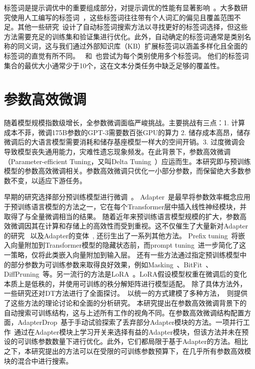 标签词是提示调优中的重要组成部分，对提示调优的性能有显著影响~\cite{holtzman2021surface, gao2020making}。大多数研究使用人工编写的标签词~\cite{schick2020exploiting}，这些标签词往往带有个人词汇的偏见且覆盖范围不足。其他一些研究~\cite{gao2020making, shin2020autoprompt,liu2021gpt,schick2020automatically}设计了自动标签词搜索方法以寻找更好的标签词选择，但这些方法需要充足的训练集和验证集进行优化。此外，自动确定的标签词通常是类别名称的同义词，这与我们通过外部知识库（KB）扩展标签词以涵盖多样化且全面的标签词的直觉有所不同。  
~\citet{schick2020automatically}和~\citet{shin2020autoprompt}也尝试为每个类别使用多个标签词。  
他们的标签词集合的最优大小通常少于10个，这在文本分类任务中缺乏足够的覆盖性。

\section{参数高效微调}
随着模型规模指数级增长，全参数微调面临严峻挑战。主要挑战有三点：1. 计算成本不菲，微调175B参数的GPT-3需要数百张GPU的算力 2. 储存成本高昂，储存微调后的大语言模型需要消耗和储存基座模型一样大的空间开销。3. 过度微调会导致模型丧失通用能力，灾难性遗忘现象频发。在此背景下，参数高效微调（Parameter-efficient Tuning，又叫Delta Tuning~\cite{ding2022delta}）应运而生。本研究即与预训练模型的参数高效微调相关。参数高效微调只优化一小部分参数，而保留绝大多数参数不变，以适应下游任务。

早期的研究选择部分预训练模型进行微调~\cite{tajbakhsh2016convolutional, guo2020adafilter, guo2019spottune}。  
Adapter~\cite{houlsby2019parameter}是最早将参数效率概念应用于预训练语言模型的方法之一，它在每个Transformer层中插入线性神经模块，并取得了与全量微调相当的结果。  
随着近年来预训练语言模型规模的扩大，参数高效微调因其在计算和存储上的高效性而受到重视。这不仅催生了大量新对Adapter的研究~\cite{pfeiffer2020adapterfusion,he2021effectiveness} %
以及Adapter的变体~\cite{pfeiffer2020adapterfusion, mahabadi2021compacter,sung2021vl},  %
还衍生出了一系列其他方法。  
Prefix tuning~\cite{li2021prefix}将嵌入向量附加到Transformer模型的隐藏状态前，而prompt tuning~\cite{lester2021power}进一步简化了这一策略，仅将此类嵌入向量附加到输入层。  
还有一些方法通过指定预训练模型中的部分参数为可训练参数来取得良好效果，例如Masking~\cite{zhao2020masking}、BitFit~\cite{zaken2021bitfit}、DiffPruning~\cite{guo2021parameter}等。另一流行的方法是LoRA~\cite{hu2021lora}。LoRA假设模型权重在微调后的变化本质上是低秩的，并使用可训练的秩分解矩阵进行模型适配。  
除了具体方法外，一些研究还对DT方法进行了全面探讨。~\citet{he2022unified}以统一的方式建模了多种方法，~\citet{ding2022delta}则提供了这些方法的理论讨论和全面的分析研究。  
本研究提出在参数高效微调背景下的自动搜索可训练结构，这与上述所有工作的视角不同。在参数高效微调结构配置方面，AdapterDrop~\cite{ruckle-etal-2021-adapterdrop}基于手动试验探索了丢弃部分Adapter模块的方法。一项并行工作~\cite{moosavi2022adaptable}通过在Adapter模块上学习开关来选择有益的Adapter模块，但该方法并未在预设的可训练参数数量下进行优化。此外，它们都局限于基于Adapter的方法。相比之下，本研究提出的方法可以在受限的可训练参数预算下，在几乎所有参数高效模块的混合中进行搜索。  


